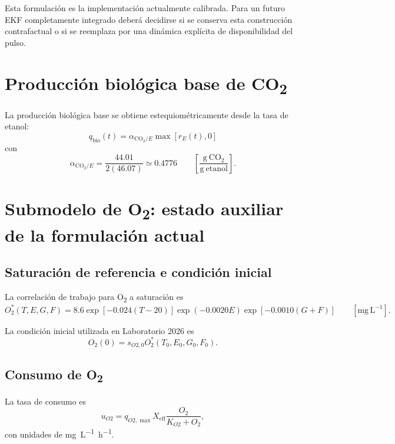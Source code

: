 \documentclass[11pt,a4paper]{article}
\newcommand{\COtwo}{\mathrm{CO_2}}
\newcommand{\mgL}{\mathrm{mg\,L^{-1}}}
\begin{document}
Esta formulación es la implementación actualmente calibrada. Para un futuro EKF completamente
integrado deberá decidirse si se conserva esta construcción contrafactual o si se reemplaza por una
dinámica explícita de disponibilidad del pulso.

\section{Producción biológica base de CO\textsubscript{2}}

La producción biológica base se obtiene estequiométricamente desde la tasa de etanol:
\begin{equation}
\boxed{
q_{\mathrm{bio}}(t)
=
\alpha_{\COtwo/E}
\max\left[r_E(t),0\right]
}
\label{eq:qbio}
\end{equation}
con
\begin{equation}
\boxed{
\alpha_{\COtwo/E}
=
\frac{44.01}{2(46.07)}
\simeq 0.4776
}
\qquad
\left[
\frac{\mathrm{g\ CO_2}}{\mathrm{g\ etanol}}
\right].
\label{eq:alphaCO2}
\end{equation}

\section{Submodelo de O\textsubscript{2}: estado auxiliar de la formulación actual}

\subsection{Saturación de referencia e condición inicial}

La correlación de trabajo para O\textsubscript{2} a saturación es
\begin{equation}
O_2^\ast(T,E,G,F)
=
8.6
\exp[-0.024(T-20)]
\exp(-0.0020E)
\exp[-0.0010(G+F)]
\qquad [\mgL].
\label{eq:o2sat}
\end{equation}

La condición inicial utilizada en Laboratorio 2026 es
\begin{equation}
\boxed{
O_2(0)=
s_{O2,0}
O_2^\ast(T_0,E_0,G_0,F_0).
}
\label{eq:o2initial}
\end{equation}

\subsection{Consumo de O\textsubscript{2}}

La tasa de consumo es
\begin{equation}
u_{O2}
=
q_{O2,\max}
X_{\mathrm{eff}}
\frac{O_2}{K_{O2}+O_2},
\label{eq:o2uptake}
\end{equation}
con unidades de \si{mg.L^{-1}.h^{-1}}.
\end{document}

